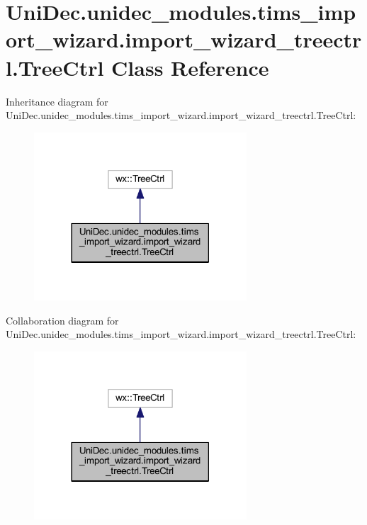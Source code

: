 \hypertarget{class_uni_dec_1_1unidec__modules_1_1tims__import__wizard_1_1import__wizard__treectrl_1_1_tree_ctrl}{}\section{Uni\+Dec.\+unidec\+\_\+modules.\+tims\+\_\+import\+\_\+wizard.\+import\+\_\+wizard\+\_\+treectrl.\+Tree\+Ctrl Class Reference}
\label{class_uni_dec_1_1unidec__modules_1_1tims__import__wizard_1_1import__wizard__treectrl_1_1_tree_ctrl}


Inheritance diagram for Uni\+Dec.\+unidec\+\_\+modules.\+tims\+\_\+import\+\_\+wizard.\+import\+\_\+wizard\+\_\+treectrl.\+Tree\+Ctrl\+:\nopagebreak
\begin{figure}[H]
\begin{center}
\leavevmode
\includegraphics[width=225pt]{class_uni_dec_1_1unidec__modules_1_1tims__import__wizard_1_1import__wizard__treectrl_1_1_tree_ctrl__inherit__graph}
\end{center}
\end{figure}


Collaboration diagram for Uni\+Dec.\+unidec\+\_\+modules.\+tims\+\_\+import\+\_\+wizard.\+import\+\_\+wizard\+\_\+treectrl.\+Tree\+Ctrl\+:\nopagebreak
\begin{figure}[H]
\begin{center}
\leavevmode
\includegraphics[width=225pt]{class_uni_dec_1_1unidec__modules_1_1tims__import__wizard_1_1import__wizard__treectrl_1_1_tree_ctrl__coll__graph}
\end{center}
\end{figure}
